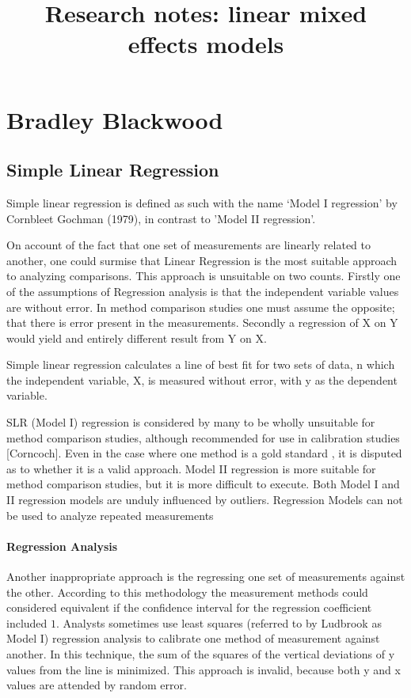 \documentclass[12pt, a4paper]{report}
\title{Research notes: linear mixed effects models}
\author{ } \date{ }
\theoremstyle{plain}
\theoremstyle{definition}
\theoremstyle{remark}
\begin{document}
	\chapter{Bradley Blackwood}
\section{Simple Linear Regression}


Simple linear regression is defined as such with the name `Model I regression' by Cornbleet Gochman (1979), in contrast to 'Model II regression'.

On account of the fact that one set of measurements are linearly related to another, one could surmise that Linear Regression is the most suitable approach to analyzing comparisons. This approach is unsuitable on two counts. Firstly one of the assumptions of Regression analysis is that the independent variable values are without error. In method comparison studies one must assume the opposite; that there is error present in the measurements. Secondly a regression of X on Y would yield and entirely different result from Y on X.


Simple linear regression calculates a line of best fit for two
sets of data, n which the independent variable, X, is measured without error, with y as the dependent variable.  

SLR (Model I) regression is considered by many \citet{BA83,CornCoch,ludbrook97} to be wholly unsuitable for
method comparison studies, although recommended for use in calibration studies [Corncoch]. Even in the case where one
method is a gold standard , it is disputed as to whether it is a valid approach. Model II regression is more suitable for method comparison studies, but it is more difficult to execute. Both Model I and II regression models are unduly influenced by outliers. Regression Models can not be used to analyze repeated measurements

\subsubsection{Regression Analysis}
Another inappropriate approach is the regressing one set of measurements against the other. According to this methodology the measurement methods could considered equivalent if the confidence interval for
the regression coefficient included $1$. Analysts sometimes use least squares (referred to by Ludbrook as Model I) regression analysis to calibrate one method of measurement against another. In this technique, the sum of the squares of the vertical deviations of y values from the line is minimized. This approach is invalid, because both y and x values are attended by random error.
\end{document}
